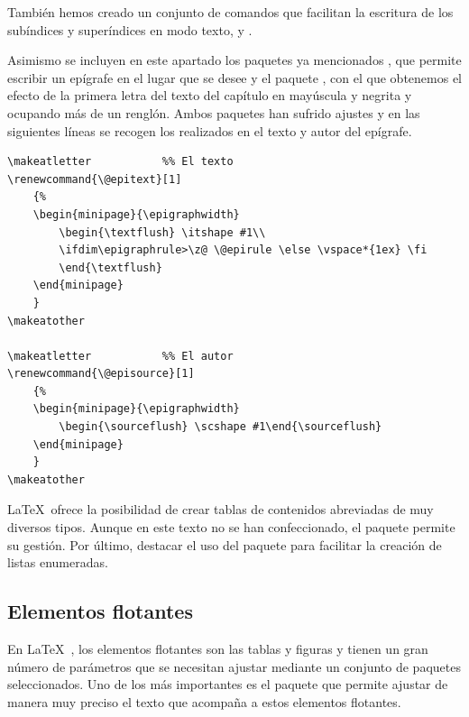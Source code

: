 También hemos creado un conjunto de comandos que facilitan la escritura de los subíndices y superíndices en modo texto,  y .

Asimismo se incluyen en este apartado los paquetes ya mencionados , que permite escribir un epígrafe en el lugar que se desee y el paquete , con el que obtenemos el efecto de la primera letra del texto del capítulo en mayúscula y negrita y ocupando más de un renglón. Ambos paquetes han sufrido ajustes y en las siguientes líneas se recogen los realizados en el texto y autor del epígrafe.

\begin{lstlisting}[frame=none]
\makeatletter			%% El texto
\renewcommand{\@epitext}[1]
	{%
	\begin{minipage}{\epigraphwidth}
		\begin{\textflush} \itshape #1\\
		\ifdim\epigraphrule>\z@ \@epirule \else \vspace*{1ex} \fi
		\end{\textflush}
	\end{minipage}
	}
\makeatother

\makeatletter			%% El autor
\renewcommand{\@episource}[1]
	{%
	\begin{minipage}{\epigraphwidth}
		\begin{\sourceflush} \scshape #1\end{\sourceflush}
	\end{minipage}
	}	
\makeatother
\end{lstlisting}

\LaTeX\ ofrece la posibilidad de crear tablas de contenidos abreviadas de muy diversos tipos. Aunque en este texto no se han confeccionado, el paquete  permite su gestión. Por último, destacar el uso del paquete  para facilitar la creación de listas enumeradas.

\subsection{Elementos flotantes}

En \LaTeX\ , los elementos flotantes son las tablas y figuras y tienen un gran número de parámetros que se necesitan ajustar mediante un conjunto de paquetes seleccionados. Uno de los más importantes es el paquete  que permite ajustar de manera muy preciso el texto que acompaña a estos elementos flotantes. 

